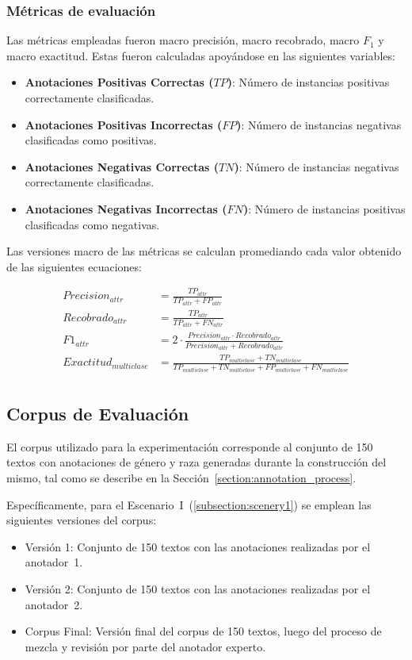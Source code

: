 \subsubsection{M\'etricas de evaluaci\'on}
Las m\'etricas empleadas fueron macro precisi\'on, macro recobrado, macro $F_1$ y 
macro exactitud. Estas fueron calculadas apoy\'andose en las siguientes variables: 

\begin{itemize}
    \item \textbf{Anotaciones Positivas Correctas ($TP$)}: N\'umero de instancias positivas correctamente clasificadas.
    \item \textbf{Anotaciones Positivas Incorrectas ($FP$)}: N\'umero de instancias negativas clasificadas como positivas.
    \item \textbf{Anotaciones Negativas Correctas ($TN$)}: N\'umero de instancias negativas correctamente clasificadas.
    \item \textbf{Anotaciones Negativas Incorrectas ($FN$)}: N\'umero de instancias positivas clasificadas como negativas.
\end{itemize}

Las versiones macro de las m\'etricas se calculan promediando cada valor obtenido de las siguientes ecuaciones:

\begin{align}
    Precision_{attr} &= \frac{TP_{attr}}{TP_{attr} + FP_{attr}}\\
    Recobrado_{attr} &= \frac{TP_{attr}}{TP_{attr} + FN_{attr}}\\
    F1_{attr} &= 2 \cdot \frac{{Precision_{attr}} \cdot {Recobrado_{attr}}}{{Precision_{attr}} + {Recobrado_{attr}}}\\
    Exactitud_{multiclase} &= \frac{TP_{multiclase} + TN_{multiclase}}{TP_{multiclase} + TN_{multiclase} + FP_{multiclase} + FN_{multiclase}}\\
\end{align}


\subsection{Corpus de Evaluaci\'on}
El corpus utilizado para la experimentaci\'on corresponde al conjunto de 150 textos con anotaciones de g\'enero y raza
generadas durante la construcci\'on del mismo, tal como se describe en la Secci\'on~\ref{section:annotation_process}.

Espec\'ificamente, para el Escenario~I~(\ref{subsection:scenery1}) se emplean las siguientes versiones del corpus:
\begin{itemize}
    \item Versi\'on 1: Conjunto de 150 textos con las anotaciones realizadas por el anotador~1.
    \item Versi\'on 2: Conjunto de 150 textos con las anotaciones realizadas por el anotador~2.
    \item Corpus Final: Versi\'on final del corpus de 150 textos, luego del proceso de mezcla y revisi\'on por parte 
    del anotador experto.
\end{itemize}

